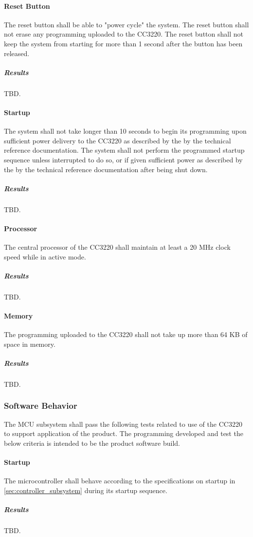 \paragraph{Reset Button} The reset button shall be able to "power cycle" the system. The reset button shall not erase
any programming uploaded to the CC3220. The reset button shall not keep the
system from starting for more than 1 second after the button has been released.
\subparagraph{Results} TBD.

\paragraph{Startup} The system shall not take longer than 10 seconds to begin
its programming upon sufficient power delivery to the CC3220 as described by
the by the technical reference documentation. The system shall not perform
the programmed startup sequence unless interrupted to do so, or if given
sufficient power as described by the by the technical reference documentation
after being shut down.
\subparagraph{Results} TBD.

\paragraph{Processor} The central processor of the CC3220 shall maintain at
least a 20 MHz clock speed while in active mode.
\subparagraph{Results} TBD.

\paragraph{Memory} The programming uploaded to the CC3220 shall not take up
more than 64 KB of space in memory.
\subparagraph{Results} TBD.

\subsubsection{Software Behavior} The MCU subsystem shall pass the following
tests related to use of the CC3220 to support application of the product. The
programming developed and test the below criteria is intended to be the
product software build.

\paragraph{Startup} The microcontroller shall behave according to the specifications on startup in \autoref{sec:controller_subsystem} during its startup sequence.
\subparagraph{Results} TBD.

